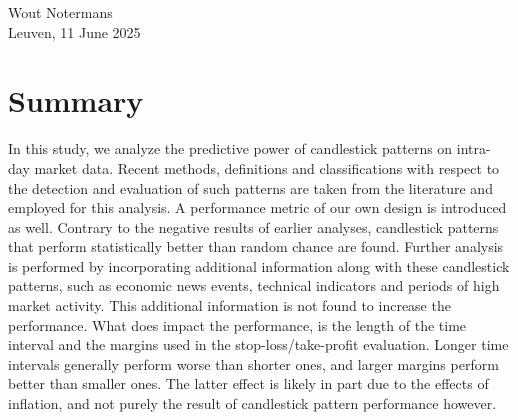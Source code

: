\begin{flushright}
  Wout Notermans\\
  Leuven, 11 June 2025
\end{flushright}
\newpage

\thispagestyle{empty}
\null
\newpage

\chapter{Summary}
In this study, we analyze the predictive power of candlestick patterns on intra-day market data. Recent methods, definitions and classifications with respect to the detection and evaluation of such patterns are taken from the literature and employed for this analysis. A performance metric of our own design is introduced as well. Contrary to the negative results of earlier analyses, candlestick patterns that perform statistically better than random chance are found. Further analysis is performed by incorporating additional information along with these candlestick patterns, such as economic news events, technical indicators and periods of high market activity. This additional information is not found to increase the performance. What does impact the performance, is the length of the time interval and the margins used in the stop-loss/take-profit evaluation. Longer time intervals generally perform worse than shorter ones, and larger margins perform better than smaller ones. The latter effect is likely in part due to the effects of inflation, and not purely the result of candlestick pattern performance however.
\vfill
\newpage

\thispagestyle{empty}
\null
\newpage

